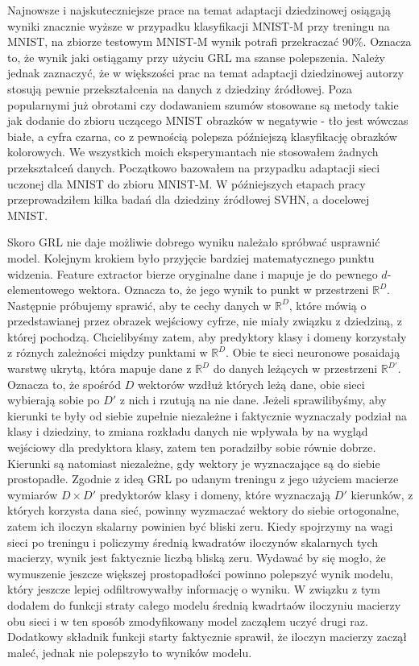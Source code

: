\documentclass{article}
\begin{document}
\par
Najnowsze i najskuteczniejsze prace na temat adaptacji dziedzinowej osiągają wyniki znacznie wyższe w przypadku klasyfikacji MNIST-M przy treningu na MNIST, na zbiorze testowym MNIST-M wynik potrafi przekraczać 90\%. Oznacza to, że wynik jaki ostiągamy przy użyciu GRL ma szanse polepszenia. Należy jednak zaznaczyć, że w większości prac na temat adaptacji dziedzinowej autorzy stosują pewnie przekształcenia na danych z dziedziny źródłowej. Poza popularnymi już obrotami czy dodawaniem szumów stosowane są metody takie jak dodanie do zbioru uczącego MNIST obrazków w negatywie - tło jest wówczas białe, a cyfra czarna, co z pewnością polepsza późniejszą klasyfikację obrazków kolorowych. We wszystkich moich eksperymantach nie stosowałem żadnych przekształceń danych. Początkowo bazowałem na przypadku adaptacji sieci uczonej dla MNIST do zbioru MNIST-M. W późniejszych etapach pracy przeprowadziłem kilka badań dla dziedziny źródłowej SVHN, a docelowej MNIST.
\par
Skoro GRL nie daje możliwie dobrego wyniku należało spróbwać usprawnić model. Kolejnym krokiem było przyjęcie bardziej matematycznego punktu widzenia. Feature extractor bierze oryginalne dane i mapuje je do pewnego $d$-elementowego wektora. Oznacza to, że jego wynik to punkt w przestrzeni $\mathbb{R}^{D}$. Następnie próbujemy sprawić, aby te cechy danych w $\mathbb{R}^{D}$, które mówią o przedstawianej przez obrazek wejściowy cyfrze, nie miały związku z dziedziną, z której pochodzą. Chcielibyśmy zatem, aby predyktory klasy i domeny korzystały z róznych zależności między punktami w $\mathbb{R}^{D}$. Obie te sieci neuronowe posaidają warstwę ukrytą, która mapuje dane z $\mathbb{R}^{D}$ do danych leżących w przestrzeni $\mathbb{R}^{D'}$. Oznacza to, że spośród $D$ wektorów wzdłuż których leżą dane, obie sieci wybierają sobie po $D'$ z nich i rzutują na nie dane. Jeżeli sprawilibyśmy, aby kierunki te były od siebie zupełnie niezależne i faktycznie wyznaczały podział na klasy i dziedziny, to zmiana rozkładu danych nie wpływała by na wygląd wejściowy dla predyktora klasy, zatem ten poradziłby sobie równie dobrze. Kierunki są natomiast niezależne, gdy wektory je wyznaczające są do siebie prostopadłe. Zgodnie z ideą GRL po udanym treningu z jego użyciem macierze wymiarów $D \times D'$ predyktorów klasy i domeny, które wyznaczają $D'$ kierunków, z których korzysta dana sieć, powinny wyzmaczać wektory do siebie ortogonalne, zatem ich iloczyn skalarny powinien być bliski zeru. Kiedy spojrzymy na wagi sieci po treningu i policzymy średnią kwadratów iloczynów skalarnych tych macierzy, wynik jest faktycznie liczbą bliską zeru. Wydawać by się mogło, że wymuszenie jeszcze większej prostopadłości powinno polepszyć wynik modelu, który jeszcze lepiej odfiltrowywałby informację o wyniku. W związku z tym dodałem do funkcji straty całego modelu średnią kwadrtaów iloczyniu macierzy obu sieci i w ten sposób zmodyfikowany model zacząłem uczyć drugi raz. Dodatkowy składnik funkcji starty faktycznie sprawił, że iloczyn macierzy zaczął maleć, jednak nie polepszyło to wyników modelu. 
\end{document}
